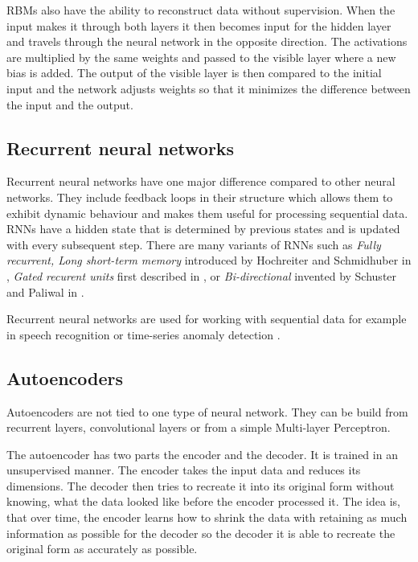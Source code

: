 RBMs also have the ability to reconstruct data without supervision. When the input makes it through both layers it then becomes input for the hidden layer and travels through the neural network in the opposite direction. The activations are multiplied by the same weights and passed to the visible layer where a new bias is added. The output of the visible layer is then compared to the initial input and the network adjusts weights so that it minimizes the difference between the input and the output.

\subsection{Recurrent neural networks}
Recurrent neural networks have one major difference compared to other neural networks. They include feedback loops in their structure which allows them to exhibit dynamic behaviour and makes them useful for processing sequential data. RNNs have a hidden state that is determined by previous states and is updated with every subsequent step. There are many variants of RNNs such as \textit{Fully recurrent, Long short-term memory} introduced by Hochreiter and Schmidhuber in \cite{doi:10.1162/neco.1997.9.8.1735}, \textit{Gated recurent units} first described in \cite{cho-etal-2014-learning}, or \textit{Bi-directional} invented by Schuster and Paliwal in \cite{Schuster1997BidirectionalRN}. 

Recurrent neural networks are used for working with sequential data for example in speech recognition \cite{DBLP:journals/corr/abs-1303-5778} or time-series anomaly detection \cite{inproceedings_RNN_anomaly_detection}.


\subsection{Autoencoders}
Autoencoders are not tied to one type of neural network. They can be build from recurrent layers, convolutional layers or from a simple Multi-layer Perceptron.

The autoencoder has two parts the encoder and the decoder. It is trained in an unsupervised manner. The encoder takes the input data and reduces its dimensions. The decoder then tries to recreate it into its original form without knowing, what the data looked like before the encoder processed it. The idea is, that over time, the encoder learns how to shrink the data with retaining as much information as possible for the decoder so the decoder it is able to recreate the original form as accurately as possible. 

